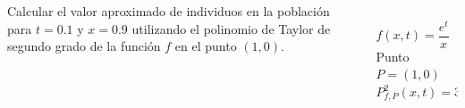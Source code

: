 \documentclass[aspectratio=149,10pt,t]{beamer}
\begin{document}
\begin{frame}
\begin{columns}
\begin{column}[T]{0.6\textwidth}
Calcular el valor aproximado de individuos en la población para $t=0.1$ y $x=0.9$ utilizando el polinomio de Taylor de segundo grado de la función $f$ en el punto $(1,0)$.
\end{column}
\begin{column}[T]{0.4\textwidth}
\\
$f(x,t)=\dfrac{e^t}{x}$\\
Punto $P=(1,0)$\\
$P^2_{f,P}(x,t)=3-3x+2t+x^2+\frac{t^2}{2}-xt$
\end{column}
\end{columns}
\end{frame}
\end{document}
